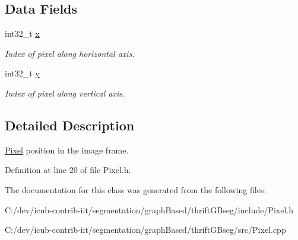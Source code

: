 \subsection*{Data Fields}
\begin{DoxyCompactItemize}
\item 
\mbox{\label{classyarp_1_1sig_1_1Pixel_a4d6a5b0c693035c4012aa15e8f8b4b64}} 
int32\+\_\+t \hyperlink{classyarp_1_1sig_1_1Pixel_a4d6a5b0c693035c4012aa15e8f8b4b64}{x}
\begin{DoxyCompactList}\small\item\em Index of pixel along horizontal axis. \end{DoxyCompactList}\item 
\mbox{\label{classyarp_1_1sig_1_1Pixel_a2ac1d9f1602f323fb9ca9fe62541aeb2}} 
int32\+\_\+t \hyperlink{classyarp_1_1sig_1_1Pixel_a2ac1d9f1602f323fb9ca9fe62541aeb2}{y}
\begin{DoxyCompactList}\small\item\em Index of pixel along vertical axis. \end{DoxyCompactList}\end{DoxyCompactItemize}


\subsection{Detailed Description}
\hyperlink{classyarp_1_1sig_1_1Pixel}{Pixel} position in the image frame. 

Definition at line 20 of file Pixel.\+h.



The documentation for this class was generated from the following files\+:\begin{DoxyCompactItemize}
\item 
C\+:/dev/icub-\/contrib-\/iit/segmentation/graph\+Based/thrift\+G\+Bseg/include/Pixel.\+h\item 
C\+:/dev/icub-\/contrib-\/iit/segmentation/graph\+Based/thrift\+G\+Bseg/src/Pixel.\+cpp\end{DoxyCompactItemize}
